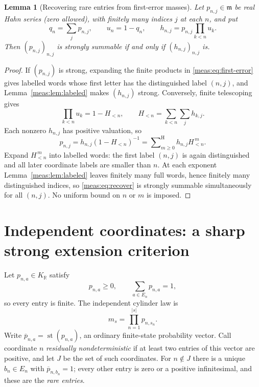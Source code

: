 \documentclass[11pt]{article}
\numberwithin{equation}{section}
\newtheorem{lemma}[theorem]{Lemma}
\theoremstyle{definition}
\theoremstyle{remark}
\newcommand{\R}{\mathbb R}
\newcommand{\KR}{K_{\R}}
\newcommand{\st}{\operatorname{st}}
\newcommand{\hsum}{\mathop{\sum}\nolimits^{\mathrm H}}
\newcommand{\abs}[1]{\lvert#1\rvert}
\begin{document}
\begin{lemma}[Recovering rare entries from first-error masses]
\label{meas:lem:recover}
Let $p_{n,j}\in\mathfrak m$ be real Hahn series (zero allowed), with finitely
many indices $j$ at each $n$, and put
\begin{equation}\label{meas:eq:first-error}
 q_n=\sum_jp_{n,j},\qquad u_n=1-q_n,\qquad h_{n,j}=p_{n,j}\prod_{k<n}u_k.
\end{equation}
Then $(p_{n,j})_{n,j}$ is strongly summable if and only if $(h_{n,j})_{n,j}$ is.
\end{lemma}
\begin{proof}
If $(p_{n,j})$ is strong, expanding the finite products in
\eqref{meas:eq:first-error} gives labelled words whose first letter has the
distinguished label $(n,j)$, and Lemma~\ref{meas:lem:labeled} makes $(h_{n,j})$
strong. Conversely, finite telescoping gives
\begin{equation}\label{meas:eq:survival}
 \prod_{k<n}u_k=1-H_{<n},\qquad H_{<n}=\sum_{k<n}\sum_jh_{k,j}.
\end{equation}
Each nonzero $h_{n,j}$ has positive valuation, so
\begin{equation}\label{meas:eq:recover}
 p_{n,j}=h_{n,j}(1-H_{<n})^{-1}=\hsum_{m\ge0}h_{n,j}H_{<n}^{\,m}.
\end{equation}
Expand $H_{<n}^{\,m}$ into labelled words: the first label $(n,j)$ is again
distinguished and all later coordinate labels are smaller than $n$. At each
exponent Lemma~\ref{meas:lem:labeled} leaves finitely many full words, hence
finitely many distinguished indices, so \eqref{meas:eq:recover} is strongly
summable simultaneously for all $(n,j)$. No uniform bound on $n$ or $m$ is
imposed.
\end{proof}

\section{Independent coordinates: a sharp strong extension criterion}
\label{meas:sec:independent}

Let $p_{n,a}\in\KR$ satisfy
\begin{equation}\label{meas:eq:prob-rows}
 p_{n,a}\ge0,\qquad\sum_{a\in E_n}p_{n,a}=1,
\end{equation}
so every entry is finite. The independent cylinder law is
\begin{equation}\label{meas:eq:independent-cylinder}
 m_s=\prod_{n=1}^{\abs s}p_{n,s_n}.
\end{equation}
Write $\overline p_{n,a}=\st(p_{n,a})$, an ordinary finite-state probability
vector. Call coordinate $n$ \emph{residually nondeterministic} if at least two
entries of this vector are positive, and let $J$ be the set of such
coordinates. For $n\notin J$ there is a unique $b_n\in E_n$ with
$\overline p_{n,b_n}=1$; every other entry is zero or a positive infinitesimal,
and these are the \emph{rare entries}.
\end{document}
